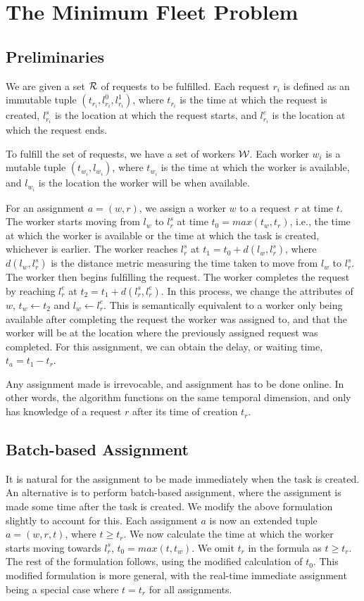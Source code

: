 \documentclass[urop]{socreport}
\begin{document}
\section{The Minimum Fleet Problem}
\subsection{Preliminaries}
We are given a set $\mathcal{R}$ of requests to be fulfilled. Each request $r_i$ is defined as an immutable tuple $(t_{r_i}, l_{r_i}^0, l_{r_i}^1)$, where $t_{r_i}$ is the time at which the request is created, $l_{r_i}^s$ is the location at which the request starts, and $l_{r_i}^e$ is the location at which the request ends. 

To fulfill the set of requests, we have a set of workers $\mathcal{W}$. Each worker $w_i$ is a mutable tuple $(t_{w_i}, l_{w_i})$, where $t_{w_i}$ is the time at which the worker is available, and $l_{w_i}$ is the location the worker will be when available.

For an assignment $a = (w, r)$, we assign a worker $w$ to a request $r$ at time $t$. The worker starts moving from $l_w$ to $l_r^s$ at time $t_0 = max(t_w, t_r)$, i.e., the time at which the worker is available or the time at which the task is created, whichever is earlier. The worker reaches $l_r^s$ at $t_1 = t_0 + d(l_w, l_r^s)$, where $d(l_w, l_r^s)$ is the distance metric measuring the time taken to move from $l_w$ to $l_r^s$. The worker then begins fulfilling the request. The worker completes the request by reaching $l_r^e$ at $t_2 = t_1 + d(l_r^s, l_r^e)$. In this process, we change the attributes of $w$, $t_w \xleftarrow{} t_2$ and $l_w \xleftarrow{} l_r^e$. This is semantically equivalent to a worker only being available after completing the request the worker was assigned to, and that the worker will be at the location where the previously assigned request was completed. For this assignment, we can obtain the delay, or waiting time, $t_{a} = t_1 - t_r$.

Any assignment made is irrevocable, and assignment has to be done online. In other words, the algorithm functions on the same temporal dimension, and only has knowledge of a request $r$ after its time of creation $t_r$. 

\subsection{Batch-based Assignment}
It is natural for the assignment to be made immediately when the task is created. An alternative is to perform batch-based assignment, where the assignment is made some time after the task is created. We modify the above formulation slightly to account for this. Each assignment $a$ is now an extended tuple $a = (w,r,t)$, where $t \geq t_r$. We now calculate the time at which the worker starts moving towards $l_r^s$, $t_0 = max(t, t_w)$. We omit $t_r$ in the formula as $t \geq t_r$. The rest of the formulation follows, using the modified calculation of $t_0$. This modified formulation is more general, with the real-time immediate assignment being a special case where $t = t_r$ for all assignments.
\end{document}
